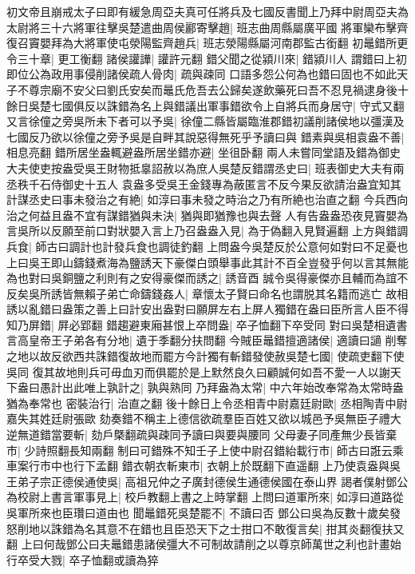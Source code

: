 初文帝且崩戒太子曰即有緩急周亞夫真可任將兵及七國反書聞上乃拜中尉周亞夫為太尉將三十六將軍往擊吳楚遣曲周侯酈寄擊趙|{
	班志曲周縣屬廣平國}
將軍欒布擊齊復召竇嬰拜為大將軍使屯滎陽監齊趙兵|{
	班志滎陽縣屬河南郡監古銜翻}
初鼂錯所更令三十章|{
	更工衡翻}
諸侯讙譁|{
	讙許元翻}
錯父聞之從潁川來|{
	錯潁川人}
謂錯曰上初即位公為政用事侵削諸侯疏人骨肉|{
	疏與疎同}
口語多怨公何為也錯曰固也不如此天子不尊宗廟不安父曰劉氏安矣而鼂氏危吾去公歸矣遂飲藥死曰吾不忍見禍逮身後十餘日吳楚七國俱反以誅錯為名上與錯議出軍事錯欲令上自將兵而身居守|{
	守式又翻}
又言徐僮之旁吳所未下者可以予吳|{
	徐僮二縣皆屬臨淮郡錯初議削諸侯地以彊漢及七國反乃欲以徐僮之旁予吳是自畔其說惡得無死乎予讀曰與}
錯素與吳相袁盎不善|{
	相息亮翻}
錯所居坐盎輒避盎所居坐錯亦避|{
	坐徂卧翻}
兩人未嘗同堂語及錯為御史大夫使吏按盎受吳王財物抵辠詔赦以為庶人吳楚反錯謂丞史曰|{
	班表御史大夫有兩丞秩千石侍御史十五人}
袁盎多受吳王金錢專為蔽匿言不反今果反欲請治盎宜知其計謀丞史曰事未發治之有絶|{
	如淳曰事未發之時治之乃有所絶也治直之翻}
今兵西向治之何益且盎不宜有謀錯猶與未決|{
	猶與即猶豫也與去聲}
人有告盎盎恐夜見竇嬰為言吳所以反願至前口對狀嬰入言上乃召盎盎入見|{
	為于偽翻入見賢遍翻}
上方與錯調兵食|{
	師古曰調計也計發兵食也調徒釣翻}
上問盎今吳楚反於公意何如對曰不足憂也上曰吳王即山鑄錢煮海為鹽誘天下豪傑白頭舉事此其計不百全豈發乎何以言其無能為也對曰吳銅鹽之利則有之安得豪傑而誘之|{
	誘音酉}
誠令吳得豪傑亦且輔而為誼不反矣吳所誘皆無賴子弟亡命鑄錢姦人|{
	章懷太子賢曰命名也謂脱其名籍而逃亡}
故相誘以亂錯曰盎策之善上曰計安出盎對曰願屏左右上屏人獨錯在盎曰臣所言人臣不得知乃屏錯|{
	屛必郢翻}
錯趨避東廂甚恨上卒問盎|{
	卒子恤翻下卒受同}
對曰吳楚相遺書言高皇帝王子弟各有分地|{
	遺于季翻分扶問翻}
今賊臣鼂錯擅適諸侯|{
	適讀曰讁}
削奪之地以故反欲西共誅錯復故地而罷方今計獨有斬錯發使赦吳楚七國|{
	使疏吏翻下使吳同}
復其故地則兵可毋血刃而俱罷於是上默然良久曰顧誠何如吾不愛一人以謝天下盎曰愚計出此唯上孰計之|{
	孰與熟同}
乃拜盎為太常|{
	中六年始改奉常為太常時盎猶為奉常也}
密裝治行|{
	治直之翻}
後十餘日上令丞相青中尉嘉廷尉歐|{
	丞相陶青中尉嘉失其姓廷尉張歐}
劾奏錯不稱主上德信欲疏羣臣百姓又欲以城邑予吳無臣子禮大逆無道錯當要斬|{
	劾戶槩翻疏與疎同予讀曰與要與腰同}
父母妻子同產無少長皆棄市|{
	少詩照翻長知兩翻}
制曰可錯殊不知壬子上使中尉召錯紿載行市|{
	師古曰誑云乘車案行市中也行下孟翻}
錯衣朝衣斬東市|{
	衣朝上於既翻下直遥翻}
上乃使袁盎與吳王弟子宗正德侯通使吳|{
	高祖兄仲之子廣封德侯生通德侯國在泰山界}
謁者僕射鄧公為校尉上書言軍事見上|{
	校戶教翻上書之上時掌翻}
上問曰道軍所來|{
	如淳曰道路從吳軍所來也臣瓚曰道由也}
聞鼂錯死吳楚罷不|{
	不讀曰否}
鄧公曰吳為反數十歲矣發怒削地以誅錯為名其意不在錯也且臣恐天下之士拑口不敢復言矣|{
	拑其炎翻復扶又翻}
上曰何哉鄧公曰夫鼂錯患諸侯彊大不可制故請削之以尊京師萬世之利也計畫始行卒受大戮|{
	卒子恤翻或讀為猝}
